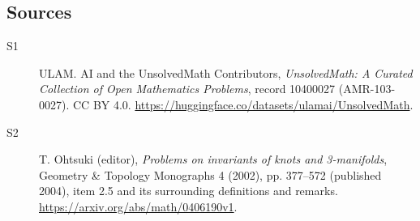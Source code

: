\documentclass[11pt]{article}
\begin{document}
\subsection{Sources}
\begin{description}
\item[\hypertarget{source:10400027:1}{S1}] ULAM. AI and the UnsolvedMath Contributors, \emph{UnsolvedMath: A Curated Collection of Open Mathematics Problems}, record 10400027 (AMR-103-0027). CC BY 4.0. \url{https://huggingface.co/datasets/ulamai/UnsolvedMath}.
\item[\hypertarget{source:10400027:2}{S2}] T. Ohtsuki (editor), \emph{Problems on invariants of knots and 3-manifolds}, Geometry \& Topology Monographs 4 (2002), pp. 377--572 (published 2004), item 2.5 and its surrounding definitions and remarks. \url{https://arxiv.org/abs/math/0406190v1}.
\end{description}
\label{end:10400027}
\end{document}
